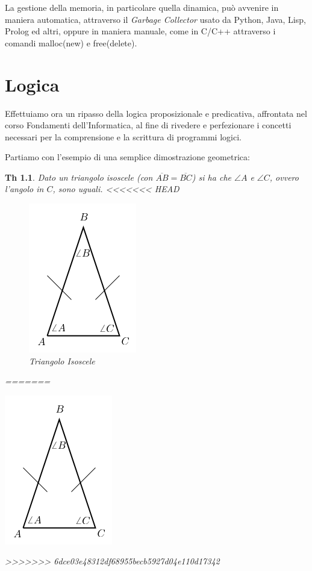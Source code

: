\documentclass[a4paper]{book}
\newtheorem*{teorema}{Th}
\begin{document}
La gestione della memoria, in particolare quella dinamica, può avvenire in maniera automatica, attraverso il \emph{Garbage Collector}
usato da Python, Java, Lisp, Prolog ed altri, oppure in maniera manuale, come in C/C++ attraverso i comandi malloc(new) e free(delete).
\chapter{Logica}
Effettuiamo ora un ripasso della logica proposizionale e predicativa, affrontata nel corso Fondamenti dell'Informatica, al fine di rivedere
e perfezionare i concetti necessari per la comprensione e la scrittura di programmi logici.

Partiamo con l'esempio di una semplice dimostrazione geometrica:
\begin{teorema}
  Dato un triangolo isoscele (con $\overline{AB}=\overline{BC}$) si ha che $\angle A$ e $\angle C$, ovvero l'angolo in $C$, sono uguali.
<<<<<<< HEAD
\begin{figure}
\caption{Triangolo Isoscele}
\includegraphics[scale=0.5]{img/tri.png}
\end{figure}
=======
\begin{center}
\includegraphics[scale=0.5]{img/tri.png}
\end{center}
>>>>>>> 6dce03e48312df68955becb5927d04e110d17342
\end{teorema}
\end{document}
